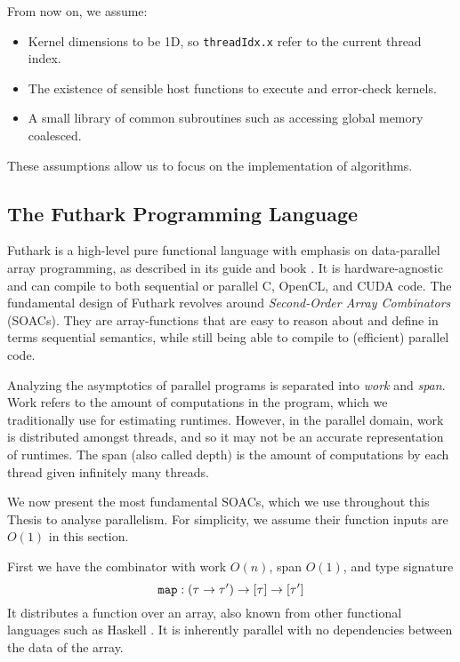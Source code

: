 From now on, we assume:
\begin{itemize}
  \renewcommand\labelitemi{--}
\item Kernel dimensions to be 1D, so \texttt{threadIdx.x} refer to the current thread index.
  \item The existence of sensible host functions to execute and error-check kernels.
  \item A small library of common subroutines such as accessing global memory coalesced.
\end{itemize}
These assumptions allow us to focus on the implementation of algorithms.

\subsection{The Futhark Programming Language}
\label{subsec:futhark}

Futhark is a high-level pure functional language with emphasis on data-parallel
array programming, as described in its guide and book
\cite{futguide,ParallelProgrammingInFuthark}. It is hardware-agnostic and can
compile to both sequential or parallel C, OpenCL, and CUDA code. The fundamental
design of Futhark revolves around \textit{Second-Order Array Combinators}
(SOACs). They are array-functions that are easy to reason about and define in
terms sequential semantics, while still being able to compile to (efficient)
parallel code.

Analyzing the asymptotics of parallel programs is separated into \textit{work}
and \textit{span}. Work refers to the amount of computations in the program,
which we traditionally use for estimating runtimes. However, in the parallel
domain, work is distributed amongst threads, and so it may not be an accurate
representation of runtimes. The span (also called depth) is the amount of
computations by each thread given infinitely many threads.

We now present the most fundamental SOACs, which we use throughout this Thesis
to analyse parallelism. For simplicity, we assume their function inputs are
$O(1)$ in this section.

First we have the combinator  with work $O(n)$, span $O(1)$, and type
signature
\begin{equation}
\mathtt{map}:(\tau \to \tau') \to \mathtt{[}\tau\mathtt{]} \to \mathtt{[}\tau'\mathtt{]}
\end{equation}
It distributes a function over an array, also known from other functional
languages such as Haskell \cite{marlow2010haskell}. It is inherently parallel
with no dependencies between the data of the array.

